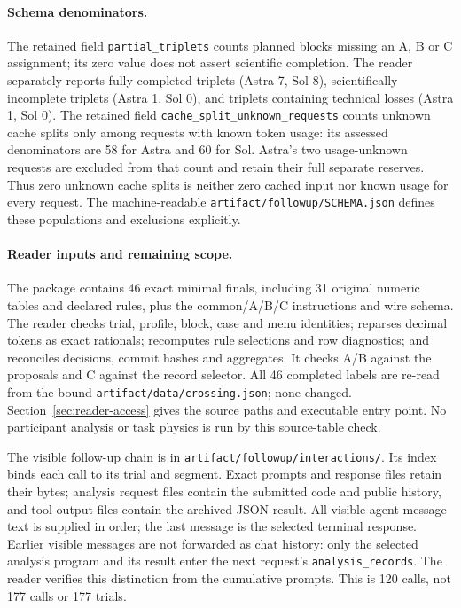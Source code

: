 \paragraph{Schema denominators.}
The retained field \texttt{partial\_triplets} counts planned blocks missing
an A, B or C assignment; its zero value does not assert scientific completion.
The reader separately reports fully completed triplets (Astra 7, Sol 8),
scientifically incomplete triplets (Astra 1, Sol 0), and triplets containing
technical losses (Astra 1, Sol 0). The retained field
\texttt{cache\_split\_unknown\_requests} counts unknown cache splits only
among requests with known token usage: its assessed denominators are
58 for Astra and 60 for Sol. Astra's two usage-unknown requests are excluded
from that count and retain their full separate reserves. Thus zero unknown
cache splits is neither zero cached input nor known usage for every request.
The machine-readable \texttt{artifact/followup/SCHEMA.json} defines these
populations and exclusions explicitly.

\paragraph{Reader inputs and remaining scope.}
The package contains 46 exact minimal finals, including 31 original numeric
tables and declared rules, plus the common/A/B/C instructions and wire schema.
The reader checks trial, profile, block, case and menu identities; reparses
decimal tokens as exact rationals; recomputes rule selections and row diagnostics;
and reconciles decisions, commit hashes and aggregates. It checks A/B against
the proposals and C against the record selector. All 46 completed labels are
re-read from the bound \texttt{artifact/data/crossing.json}; none changed.
Section~\ref{sec:reader-access} gives the source paths and executable entry point. No participant
analysis or task physics is run by this source-table check.

The visible follow-up chain is in \texttt{artifact/followup/interactions/}.
Its index binds each call to its trial and segment. Exact prompts and response
files retain their bytes; analysis request files contain the submitted code
and public history, and tool-output files contain the archived JSON result.
All visible agent-message text is supplied in order; the last message is the
selected terminal response. Earlier visible messages are not forwarded as
chat history: only the selected analysis program and its result enter the
next request's \texttt{analysis\_records}. The reader verifies this distinction
from the cumulative prompts. This is 120 calls, not 177 calls or 177 trials.

